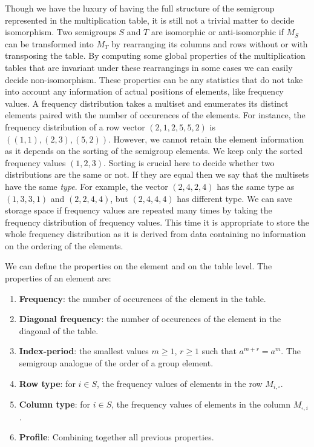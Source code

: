 \documentclass{amsart}
\theoremstyle{plain}
\theoremstyle{definition}
\begin{document}
Though we have the luxury of having the full structure of the semigroup represented in the multiplication table, it is still not a trivial matter to decide isomorphism.
Two semigroups $S$ and $T$ are isomorphic or anti-isomorphic if $M_S$ can be transformed into $M_T$ by rearranging its columns and rows without or with transposing the table.
By computing some global properties of the multiplication tables that are invariant under these rearrangings in some cases we can easily decide non-isomorphism.
These properties can be any statistics that do not take into account any information of actual positions of elements, like frequency values.
A frequency distribution takes a multiset and enumerates its distinct elements paired with the number of occurences of the elements.
For instance, the  frequency distribution of a row vector $(2,1,2,5,5,2)$ is $((1,1),(2,3),(5,2))$.
However, we cannot retain the element information as it depends on the sorting of the semigroup elements.
We keep only the sorted frequency values $(1,2,3)$.
Sorting is crucial here to decide whether two distributions are the same or not.
If they are equal then we say that the multisets have the same \emph{type}.
For example, the vector $(2,4,2,4)$ has the same type as $(1,3,3,1)$ and $(2,2,4,4)$, but $(2,4,4,4)$ has different type.
We can save storage space if frequency values are repeated many times by taking the frequency distribution of frequency values.
This time it is appropriate to store the whole frequency distribution as it is derived from data containing no information on the ordering of the elements.

We can define the properties on the element and on the table level. The properties of an element are:

\begin{enumerate}
\item\textbf{Frequency}: the number of occurences of the element in the table.
\item \textbf{Diagonal frequency}: the number of occurences of the element in the diagonal of the table.
\item \textbf{Index-period}: the smallest values $m\geq 1$, $r\geq 1$ such that $a^{m+r}=a^m$. The semigroup analogue of the order of a group element.
\item \textbf{Row type}: for $i\in S$, the frequency values of elements in the row $M_{i,\square}$.
\item \textbf{Column type}:  for $i\in S$, the frequency values of elements in the column $M_{\square,i}$.
\item \textbf{Profile}: Combining together all previous properties.
\end{enumerate} 
\end{document}
